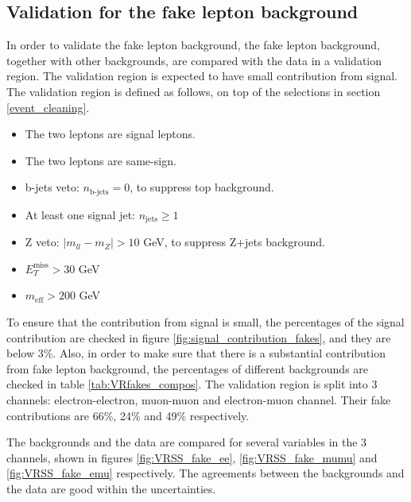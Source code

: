 \subsection{Validation for the fake lepton background}
In order to validate the fake lepton background, the fake lepton background, together with other backgrounds, are compared with the data in a validation region.
The validation region is expected to have small contribution from signal.
The validation region is defined as follows, on top of the selections in section \ref{event_cleaning}.
\begin{itemize}
\item The two leptons are signal leptons.
\item The two leptons are same-sign.
\item b-jets veto: $n_{\text{b-jets}} = 0$, to suppress top background.
\item At least one signal jet: $n_{\text{jets}} \geq 1$
\item Z veto: $|m_{ll} - m_Z| > 10$ GeV, to suppress Z+jets background.
\item $E_{T}^{\text{miss}} > 30$ GeV
\item $m_{\text{eff}} > 200$ GeV
\end{itemize}

To ensure that the contribution from signal is small, the percentages of the signal contribution are checked in figure \ref{fig:signal_contribution_fakes}, and they are below 3\%.
Also, in order to make sure that there is a substantial contribution from fake lepton background, the percentages of different backgrounds are checked in table \ref{tab:VRfakes_compos}.
The validation region is split into 3 channels: electron-electron, muon-muon and electron-muon channel.
Their fake contributions are 66\%,  24\% and 49\% respectively.

The backgrounds and the data are compared for several variables in the 3 channels, shown in figures \ref{fig:VRSS_fake_ee}, \ref{fig:VRSS_fake_mumu} and \ref{fig:VRSS_fake_emu} respectively.
The agreements between the backgrounds and the data are good within the uncertainties.

